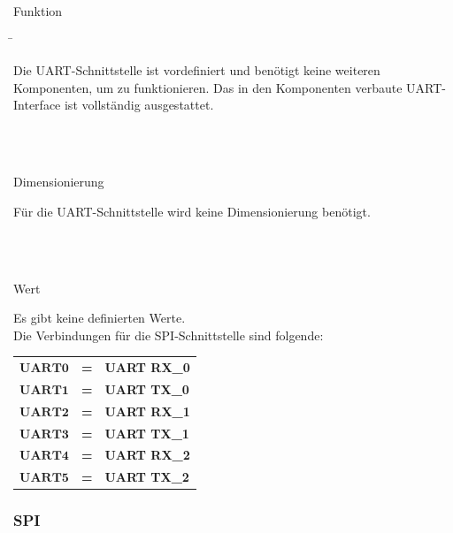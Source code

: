 \begin{tabbing}
\parbox[t]{.25\textwidth}{

Funktion

} \=\parbox[t]{.75\textwidth}{

Die UART-Schnittstelle ist vordefiniert und benötigt keine weiteren Komponenten, um zu funktionieren. Das in den Komponenten verbaute UART-Interface ist vollständig ausgestattet.

}\\
\\
\parbox[t]{.25\textwidth}{

Dimensionierung

} \>\parbox[t]{.75\textwidth}{

Für die UART-Schnittstelle wird keine Dimensionierung benötigt.

}\\
\\
\parbox[t]{.25\textwidth}{

Wert

} \>\parbox[t]{.75\textwidth}{

Es gibt keine definierten Werte.\\

Die Verbindungen für die SPI-Schnittstelle sind folgende:

\begin{tabular}{lll}
$\mathbf{UART0}$ & \textbf{=} &  \textbf{UART RX\_0} \\
$\mathbf{UART1}$ & \textbf{=} &  \textbf{UART TX\_0} \\
$\mathbf{UART2}$ & \textbf{=} &  \textbf{UART RX\_1} \\
$\mathbf{UART3}$ & \textbf{=} &  \textbf{UART TX\_1} \\
$\mathbf{UART4}$ & \textbf{=} &  \textbf{UART RX\_2} \\
$\mathbf{UART5}$ & \textbf{=} &  \textbf{UART TX\_2} \\
\end{tabular}


}
\end{tabbing}

\subsubsection{SPI}\label{subsubsec:SPI_Mikrocontroller}

